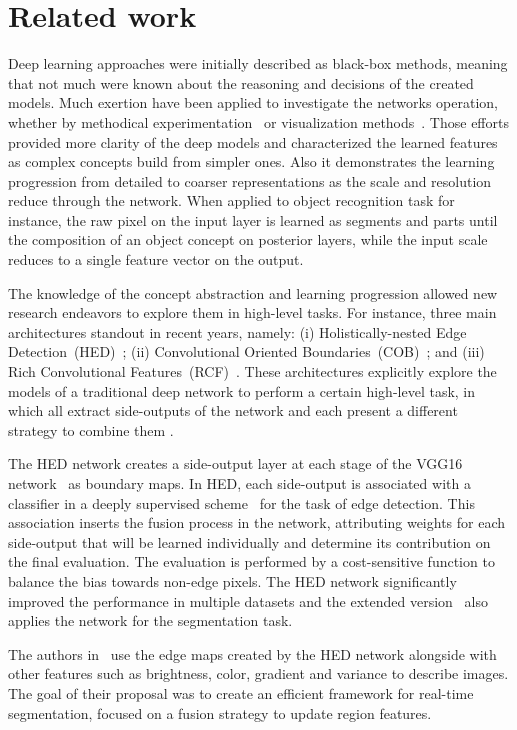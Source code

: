 \section{Related work}
\label{sec:related}

Deep learning approaches were initially described as black-box methods, meaning that not much were known about the reasoning and decisions of the created models. Much exertion have been applied to investigate the networks operation, whether by methodical experimentation~\cite{ilin17,kuo16,eigen14,zhang17} or visualization methods~\cite{simonyan13,zeiler14}. Those efforts provided more clarity of the deep models and characterized the learned features as complex concepts build from simpler ones. Also it demonstrates the learning progression from detailed to coarser representations as the scale and resolution reduce through the network.  When applied to object recognition task for instance, the raw pixel on the input layer is learned as segments and parts until the composition of an object concept on posterior layers, while the input scale reduces to a single feature vector on the output.  

The knowledge of the concept abstraction and learning progression allowed new research endeavors to explore  them in high-level tasks. For instance, three main architectures standout in recent years, namely: (i) Holistically-nested Edge Detection~(HED)~\cite{xie2015}; (ii) Convolutional Oriented Boundaries~(COB)~\cite{maninis2017}; and (iii) Rich Convolutional Features~(RCF)~\cite{liu2017}. These architectures explicitly explore the models of a traditional deep network to perform a certain high-level task, in which all extract side-outputs of the network and each present a different strategy to combine them . 

The HED network creates a side-output layer at each stage of the VGG16 network~\cite{simonyan2014} as boundary maps. In HED, each side-output is associated with a classifier in a deeply supervised scheme~\cite{lee2015} for the task of edge detection. This association inserts the fusion process in the network, attributing weights for each side-output that will be learned individually and determine its contribution on the final evaluation. The evaluation is performed by a cost-sensitive function to balance the bias towards non-edge pixels. The HED network significantly improved the performance in multiple datasets and the extended version~\cite{xie2017} also applies the network for the segmentation task. 

The authors in~\cite{cheng2016} use the edge maps created by the HED network alongside with other features such as brightness, color, gradient and variance to describe images. The goal of their proposal was to create an efficient framework for real-time segmentation, focused on a fusion strategy to update region features.


